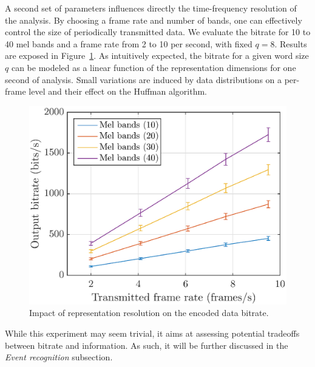 \documentclass[final,3p,times,twocolumn]{elsarticle}
\begin{document}
A second set of parameters influences directly the time-frequency resolution of the analysis. By choosing a frame rate and number of bands, one can effectively control the size of periodically transmitted data. We evaluate the bitrate for 10 to 40 mel bands and a frame rate from 2 to 10 per second, with fixed $q = 8$. Results are exposed in Figure~\ref{fig:bitrate_mel_avg}. As intuitively expected, the bitrate for a given word size $q$ can be modeled as a linear function of the representation dimensions for one second of analysis. Small variations are induced by data distributions on a per-frame level and their effect on the Huffman algorithm.

\begin{figure}[htbp]
	\centering
		\includegraphics[width=\columnwidth]{bitrate_mel_avg.eps}
	\caption{Impact of representation resolution on the encoded data bitrate.}
	\label{fig:bitrate_mel_avg}
\end{figure}

While this experiment may seem trivial, it aims at assessing potential tradeoffs between bitrate and information. As such, it will be further discussed in the \textit{Event recognition} subsection.\\
\end{document}

